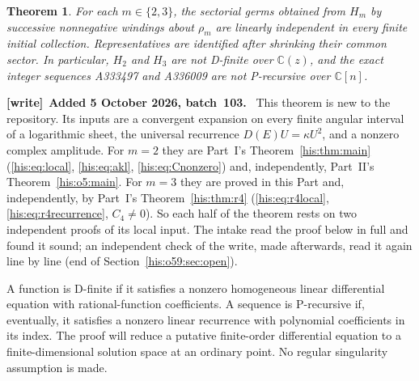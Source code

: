 \documentclass[11pt]{article}
\newtheorem{theorem}{Theorem}[section]
\theoremstyle{remark}\newtheorem{remark}[theorem]{Remark}
\newcommand{\C}{\mathbb C}
\numberwithin{equation}{section}
\newenvironment{writenote}[1][]{\par\smallskip\begingroup\small
 \noindent\textbf{[write]}\if\relax\detokenize{#1}\relax\else~\textbf{#1.}\fi\ }%
 {\par\endgroup\smallskip}
\begin{document}
\begin{theorem}\label{his:o7:notdfinite}
For each $m\in\{2,3\}$, the sectorial germs obtained from $H_m$
by successive nonnegative windings about $\rho_m$ are linearly
independent in every finite initial collection. Representatives are
identified after shrinking their common sector. In particular,
$H_2$ and $H_3$ are not D-finite over $\C(z)$, and the exact
integer sequences A333497 and A336009 are not P-recursive over
$\C[n]$.
\end{theorem}
\begin{writenote}[Added 5 October 2026, batch~103]
This theorem is new to the repository. Its inputs are a convergent expansion on every finite angular interval of a logarithmic sheet, the universal recurrence $D(E)U=\kappa U^2$, and a nonzero complex amplitude. For $m=2$ they are Part~I's Theorem~\ref{his:thm:main} (\eqref{his:eq:local}, \eqref{his:eq:akl}, \eqref{his:eq:Cnonzero}) and, independently, Part~II's Theorem~\ref{his:o5:main}. For $m=3$ they are proved in this Part and, independently, by Part~I's Theorem~\ref{his:thm:r4} (\eqref{his:eq:r4local}, \eqref{his:eq:r4recurrence}, $C_4\ne0$). So each half of the theorem rests on two independent proofs of its local input. The intake read the proof below in full and found it sound; an independent check of the write, made afterwards, read it again line by line (end of Section~\ref{his:o59:sec:open}).
\end{writenote}


A function is D-finite if it satisfies a nonzero homogeneous linear
differential equation with rational-function coefficients. A sequence
is P-recursive if, eventually, it satisfies a nonzero linear
recurrence with polynomial coefficients in its index. The proof
will reduce a putative finite-order differential equation to a
finite-dimensional solution space at an ordinary point. No regular
singularity assumption is made.
\end{document}
